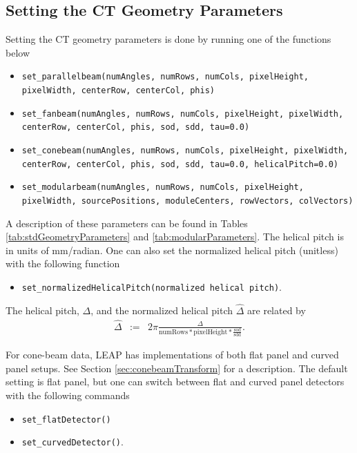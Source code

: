 \documentclass[11pt]{article}
\begin{document}
\subsection{Setting the CT Geometry Parameters}

Setting the CT geometry parameters is done by running one of the functions below
\begin{itemize}
\item[] \texttt{set\_parallelbeam(numAngles, numRows, numCols, pixelHeight, pixelWidth, centerRow, centerCol, phis)}
\item[] \texttt{set\_fanbeam(numAngles, numRows, numCols, pixelHeight, pixelWidth, centerRow, centerCol, phis, sod, sdd, tau=0.0)}
\item[] \texttt{set\_conebeam(numAngles, numRows, numCols, pixelHeight, pixelWidth, centerRow, centerCol, phis, sod, sdd, tau=0.0, helicalPitch=0.0)}
\item[] \texttt{set\_modularbeam(numAngles, numRows, numCols, pixelHeight, pixelWidth, sourcePositions, moduleCenters, rowVectors, colVectors)}
\end{itemize}
A description of these parameters can be found in Tables \ref{tab:stdGeometryParameters} and \ref{tab:modularParameters}.  The helical pitch is in units of mm/radian.  One can also set the normalized helical pitch (unitless) with the following function
\begin{itemize}
    \item[] \texttt{set\_normalizedHelicalPitch(normalized helical pitch)}.
\end{itemize}
The helical pitch, $\Delta$, and the normalized helical pitch $\widehat{\Delta}$ are related by
\begin{eqnarray*}
\widehat{\Delta} &:=& 2\pi \frac{\Delta}{\text{numRows} * \text{pixelHeight} * \frac{\text{sod}}{\text{sdd}}}.
\end{eqnarray*}

For cone-beam data, LEAP has implementations of both flat panel and curved panel setups.  See Section \ref{sec:conebeamTransform} for a description.  The default setting is flat panel, but one can switch between flat and curved panel detectors with the following commands
\begin{itemize}
\item[] \texttt{set\_flatDetector()}
\item[] \texttt{set\_curvedDetector()}.
\end{itemize}
\end{document}
